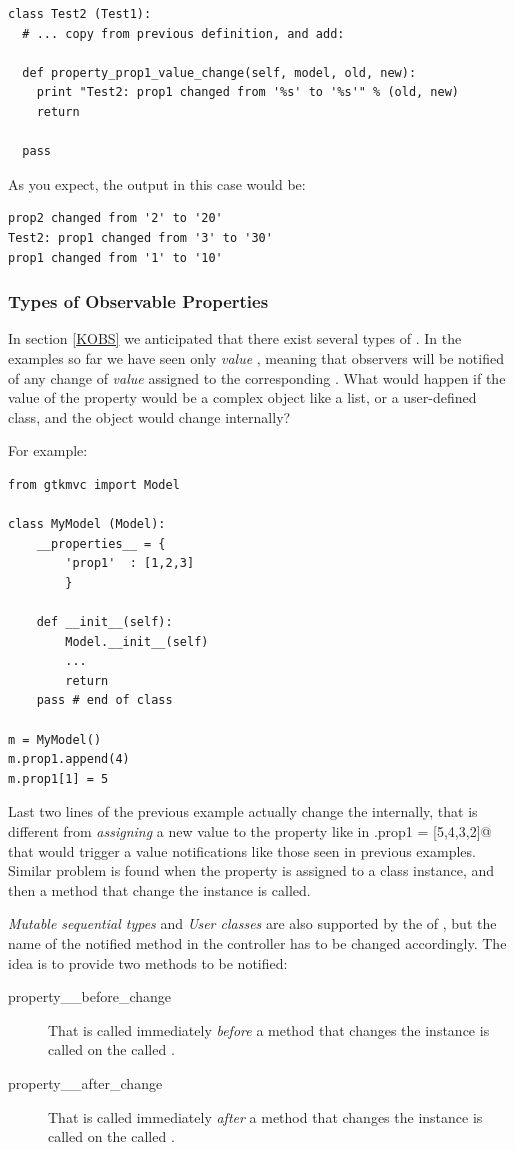{ \codesize 
\begin{verbatim} 
class Test2 (Test1):
  # ... copy from previous definition, and add:
   
  def property_prop1_value_change(self, model, old, new):
    print "Test2: prop1 changed from '%s' to '%s'" % (old, new)
    return   

  pass
\end{verbatim}
}

As you expect, the output in this case would be:
{ \codesize 
\begin{verbatim} 
prop2 changed from '2' to '20'
Test2: prop1 changed from '3' to '30'
prop1 changed from '1' to '10'
\end{verbatim}
}


\subsubsection{\label{KOBS:DET}Types of Observable Properties}

In section \ref{KOBS} we anticipated that there exist several types
of \OP. In the examples so far we have seen only \emph{value} \OPS,
meaning that observers will be notified of any change of \emph{value}
assigned to the corresponding \OP. What would happen if the value of
the property would be a complex object like a list, or a user-defined
class, and the object would change internally?

For example:

{ \codesize 
\begin{verbatim} 
from gtkmvc import Model

class MyModel (Model):
    __properties__ = {
        'prop1'  : [1,2,3]
        }

    def __init__(self):
        Model.__init__(self)
        ...
        return
    pass # end of class

m = MyModel()
m.prop1.append(4)
m.prop1[1] = 5
\end{verbatim}
}

Last two lines of the previous example actually change the \OP
internally, that is different from \emph{assigning} a new value to the
property like in \verb@m.prop1 = [5,4,3,2]@ that would trigger a value
notifications like those seen in previous examples.  Similar problem
is found when the property is assigned to a class instance, and then a
method that change the instance is called.

\emph{Mutable sequential types} and \emph{User classes} are also
supported by the \obs of \pygtkmvc, but the name of the notified
method in the controller has to be changed accordingly.
The idea is to provide two methods to be notified:
\begin{description}
\item[property\_\_before\_change] That is called
  immediately \emph{before} a method that changes the instance is
  called on the \OP called .
\item[property\_\_after\_change] That is called
  immediately \emph{after} a method that changes the instance is
  called on the \OP called .
\end{description}

